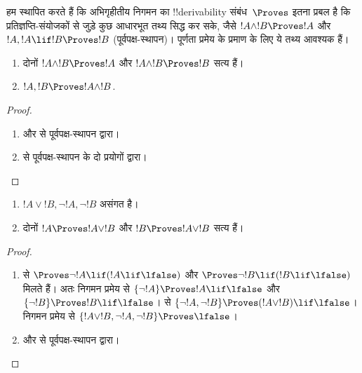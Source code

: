 \documentclass[../../../include/open-logic-section]{subfiles}
\begin{document}
      {}
      {}


\begin{explain}
  हम स्थापित करते हैं कि अभिगृहीतीय निगमन का !!{derivability}
  संबंध~$\Proves$ इतना प्रबल है कि प्रतिज्ञप्ति-संयोजकों से जुड़े कुछ
  आधारभूत तथ्य सिद्ध कर सके, जैसे $!A \land !B
  \Proves !A$ और $!A, !A \lif !B \Proves !B$ (पूर्वपक्ष-स्थापन)। पूर्णता
  प्रमेय के प्रमाण के लिए
  ये तथ्य आवश्यक हैं।
\end{explain}

\begin{prop}
  \begin{enumerate}
  \item {} दोनों $!A \land !B \Proves
    !A$ और $!A \land !B \Proves !B$ सत्य हैं।
  \item {} $!A, !B \Proves !A \land !B$.
  \end{enumerate}
\end{prop}

\begin{proof}
  \begin{enumerate}
    \item {} और  से
      पूर्वपक्ष-स्थापन द्वारा।
  \item {} से पूर्वपक्ष-स्थापन के दो प्रयोगों द्वारा।
  \end{enumerate}
\end{proof}


\begin{prop}
  \begin{enumerate}
  \item $!A \lor !B, \lnot !A, \lnot !B$ असंगत है।
  \item दोनों $!A \Proves !A \lor !B$ और $!B \Proves !A \lor !B$ सत्य हैं।
  \end{enumerate}
\end{prop}

\begin{proof}
  \begin{enumerate}
  \item {} से $\Proves \lnot !A \lif (!A
    \lif \lfalse)$ और $\Proves \lnot !B \lif (!B \lif \lfalse)$ मिलते हैं।
    अतः निगमन प्रमेय से $\{\lnot !A\} \Proves !A \lif
    \lfalse$ और
    $\{\lnot !B\} \Proves !B \lif \lfalse$।  से
    $\{\lnot !A, \lnot !B\} \Proves (!A
    \lor !B) \lif \lfalse$। निगमन प्रमेय से $\{!A \lor !B,
    \lnot !A, \lnot !B\} \Proves \lfalse$।
  \item {} और  से
    पूर्वपक्ष-स्थापन द्वारा।
  \end{enumerate}
\end{proof}
\end{document}
